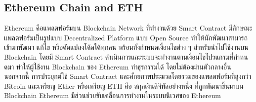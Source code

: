 \documentclass[12pt,oneside,openright,a4paper]{cpe-thai-project}
\begin{document}
\subsection{Ethereum Chain and ETH}
\tab Ethereum คือแพลตฟอร์มบน Blockchain Network ที่่ทํางานด้วย Smart Contract มีลักษณะแพลตฟอร์มเป็นรูปแบบ Decentralized Platform แบบ Open Source ทําให้นักพัฒนาสามารถเข้ามาพัฒนา แก้ไข หรือดัดแปลงโค้ดได้ทุกคน พร้อมทั้งกําหนดเงื่อนไขต่าง ๆ สําหรับนําไปใช้งานบน Blockchain โดยมี Smart Contract ดําเนินการและระบบจะทํางานตามเงื่อนไขโปรแกรมที่กําหนดมา ทําให้ผู้ใช้งาน Blockchain ของ Ethereum ทําธุรกรรมได้ โดยไม่ต้องผ่านตัวกลางอื่น นอกจากนี้ การประยุกต์ใช้ Smart Contract และศักยภาพประมวลโดยรวมของแพลตฟอร์มที่สูงกว่า Bitcoin และเหรียญ Ether หรือเหรียญ ETH คือ สกุลเงินดิจิทัลอย่างหนึ่ง ที่ถูกพัฒนาขึ้นมาบน Blockchain Ethereum มีส่วนช่วยขับเคลื่อนการทํางานในระบบนิเวศของ Ethereum
\end{document}

